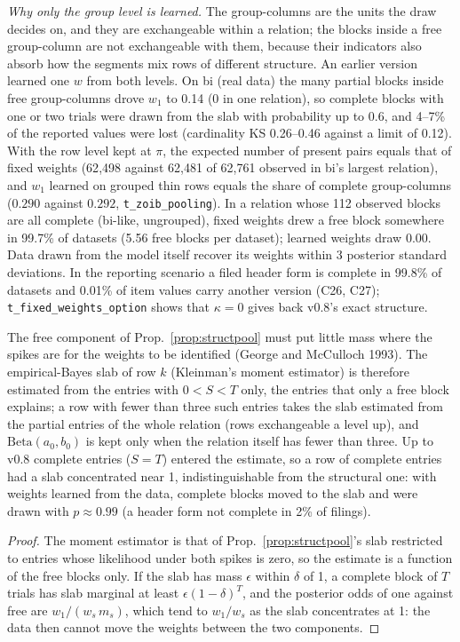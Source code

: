\noindent \emph{Why only the group level is learned.} The group-columns are the units the draw decides on, and they are exchangeable within a relation; the blocks inside a free group-column are not exchangeable with them, because their indicators also absorb how the segments mix rows of different structure. An earlier version learned one $w$ from both levels. On bi (real data) the many partial blocks inside free group-columns drove $w_1$ to 0.14 (0 in one relation), so complete blocks with one or two trials were drawn from the slab with probability up to 0.6, and 4--7\% of the reported values were lost (cardinality KS 0.26--0.46 against a limit of 0.12). With the row level kept at $\pi$, the expected number of present pairs equals that of fixed weights (62{,}498 against 62{,}481 of 62{,}761 observed in bi's largest relation), and $w_1$ learned on grouped thin rows equals the share of complete group-columns ($0.290$ against $0.292$, \texttt{t\_zoib\_pooling}). In a relation whose 112 observed blocks are all complete (bi-like, ungrouped), fixed weights drew a free block somewhere in 99.7\% of datasets (5.56 free blocks per dataset); learned weights draw 0.00. Data drawn from the model itself recover its weights within 3 posterior standard deviations. In the reporting scenario a filed header form is complete in 99.8\% of datasets and 0.01\% of item values carry another version (C26, C27); \texttt{t\_fixed\_weights\_option} shows that $\kappa=0$ gives back v0.8's exact structure.

\begin{proposition}\label{prop:partialslab}
The free component of Prop.~\ref{prop:structpool} must put little mass where the spikes are for the weights to be identified (George and McCulloch 1993). The empirical-Bayes slab of row $k$ (Kleinman's moment estimator) is therefore estimated from the entries with $0<S<T$ only, the entries that only a free block explains; a row with fewer than three such entries takes the slab estimated from the partial entries of the whole relation (rows exchangeable a level up), and $\mathrm{Beta}(a_0,b_0)$ is kept only when the relation itself has fewer than three. Up to v0.8 complete entries ($S=T$) entered the estimate, so a row of complete entries had a slab concentrated near 1, indistinguishable from the structural one: with weights learned from the data, complete blocks moved to the slab and were drawn with $p\approx0.99$ (a header form not complete in 2\% of filings).
\end{proposition}
\begin{proof}
The moment estimator is that of Prop.~\ref{prop:structpool}'s slab restricted to entries whose likelihood under both spikes is zero, so the estimate is a function of the free blocks only. If the slab has mass $\epsilon$ within $\delta$ of 1, a complete block of $T$ trials has slab marginal at least $\epsilon(1-\delta)^T$, and the posterior odds of one against free are $w_1/(w_s\,m_s)$, which tend to $w_1/w_s$ as the slab concentrates at 1: the data then cannot move the weights between the two components.
\end{proof}

